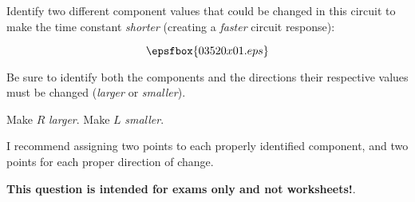 

Identify two different component values that could be changed in this circuit to make the time constant {\it shorter} (creating a {\it faster} circuit response):

$$\epsfbox{03520x01.eps}$$

Be sure to identify both the components and the directions their respective values must be changed ({\it larger} or {\it smaller}).







Make $R$ {\it larger}. \hskip 30pt Make $L$ {\it smaller}.

\vskip 10pt

I recommend assigning two points to each properly identified component, and two points for each proper direction of change.







{\bf This question is intended for exams only and not worksheets!}.



